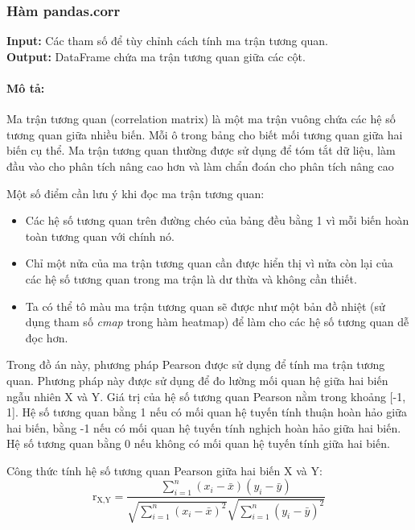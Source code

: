 \documentclass[]{article}
\begin{document}
\subsubsection{Hàm pandas.corr}
\noindent
\textbf{Input:} Các tham số để tùy chỉnh cách tính ma trận tương quan. \\
\textbf{Output:} DataFrame chứa ma trận tương quan giữa các cột.
\paragraph{Mô tả:}

Ma trận tương quan (correlation matrix) là một ma trận vuông chứa các hệ số tương quan giữa nhiều biến. Mỗi ô trong bảng cho biết mối tương quan giữa hai biến cụ thể. Ma trận tương quan thường được sử dụng để tóm tắt dữ liệu, làm đầu vào cho phân tích nâng cao hơn và làm chẩn đoán cho phân tích nâng cao

Một số điểm cần lưu ý khi đọc ma trận tương quan:
\begin{itemize}
  \item Các hệ số tương quan trên đường chéo của bảng đều bằng 1 vì mỗi biến hoàn toàn tương quan với chính nó.
  \item Chỉ một nửa của ma trận tương quan cần được hiển thị vì nửa còn lại của các hệ số tương quan trong ma trận là dư thừa và không cần thiết.
  \item Ta có thể tô màu ma trận tương quan sẽ được như một bản đồ nhiệt (sử dụng tham số \textit{cmap} trong hàm heatmap) để làm cho các hệ số tương quan dễ đọc hơn.
\end{itemize}

Trong đồ án này, phương pháp Pearson \cite{wikipediaPearsonCorrelation} được sử dụng để tính ma trận tương quan. Phương pháp này được sử dụng để đo lường mối quan hệ giữa hai biến ngẫu nhiên X và Y. Giá trị của hệ số tương quan Pearson nằm trong khoảng [-1, 1]. Hệ số tương quan bằng 1 nếu có mối quan hệ tuyến tính thuận hoàn hảo giữa hai biến, bằng -1 nếu có mối quan hệ tuyến tính nghịch hoàn hảo giữa hai biến. Hệ số tương quan bằng 0 nếu không có mối quan hệ tuyến tính giữa hai biến.

Công thức tính hệ số tương quan Pearson giữa hai biến X và Y:
\begin{equation}
    \text{r}_{\text{X,Y}} = \frac{\sum_{i=1}^{n} (x_i - \bar{x})(y_i - \bar{y})}{\sqrt{\sum_{i=1}^{n} (x_i - \bar{x})^2} \sqrt{\sum_{i=1}^{n} (y_i - \bar{y})^2}}
\end{equation}
\end{document}
